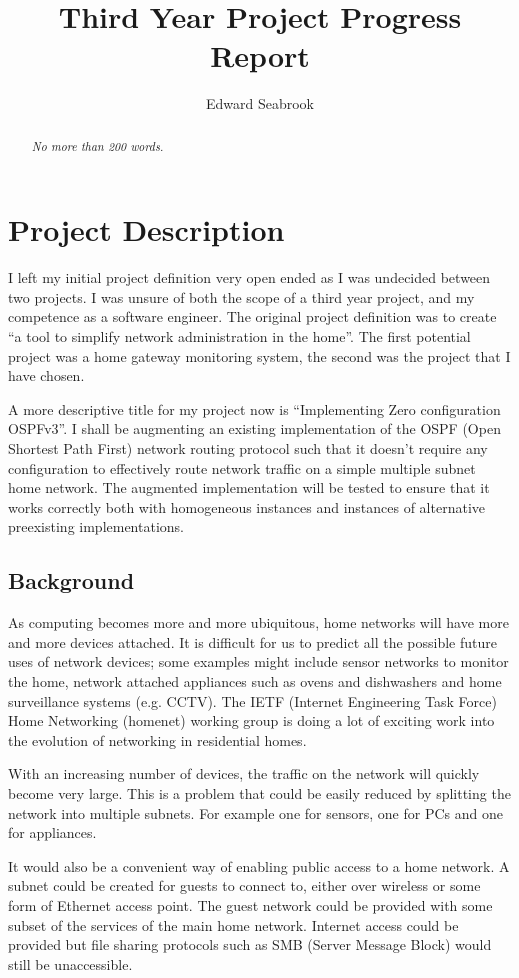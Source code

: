 \documentclass[12pt]{report}
\author{Edward Seabrook}
\title{Third Year Project Progress Report}
\begin{document}



\begin{abstract}
\em No more than 200 words. \em


\end{abstract}

\tableofcontents
\clearpage
\listoftodos

\chapter{Project Description}
I left my initial project definition very open ended as I was undecided between
two projects. I was unsure of both the scope of a third year project, and my
competence as a software engineer. The original project definition was to create
``a tool to simplify network administration in the home''. The first potential
project was a home gateway monitoring system, the second was the project that
I have chosen. 

A more descriptive title for my project now is ``Implementing Zero configuration
OSPFv3''. I shall be augmenting an existing implementation of the OSPF (Open
Shortest Path First) network routing protocol such that it doesn't require any
configuration to effectively route network traffic on a simple multiple subnet
home network. The augmented implementation will be tested to ensure that it
works correctly both with homogeneous instances and instances of alternative
preexisting implementations. 

\section{Background}
As computing becomes more and more ubiquitous, home networks will have more and
more devices attached. It is difficult for us to predict all the possible future
uses of network devices; some examples might include sensor networks to monitor
the home, network attached appliances such as ovens and dishwashers and home
surveillance systems (e.g. CCTV). The IETF (Internet Engineering Task Force)
Home Networking (homenet) working group is doing a lot of exciting work into the
evolution of networking in residential homes. 

With an increasing number of devices, the traffic on the network will quickly
become very large. This is a problem that could be easily reduced by splitting
the network into multiple subnets. For example one for sensors, one for PCs and
one for appliances. 

It would also be a convenient way of enabling public access to a home network. A
subnet could be created for guests to connect to, either over wireless or some
form of Ethernet access point. The guest network could be provided with some
subset of the services of the main home network. Internet access could be
provided but file sharing protocols such as SMB (Server Message Block) would
still be unaccessible.
\end{document}
